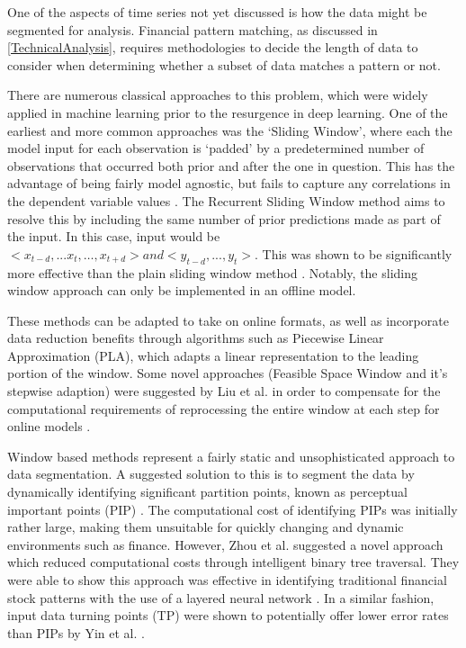 \documentclass[a4paper,latin]{paper}
\begin{document}
One of the aspects of time series not yet discussed is how the data might be segmented for analysis. 
Financial pattern matching, as discussed in \ref{TechnicalAnalysis}, requires methodologies to decide the length of data to 
consider when determining whether a subset of data matches a pattern or not. 
\hfill\break

There are numerous classical approaches to this problem, which were widely applied in machine learning prior to 
the resurgence in deep learning. One of the earliest and more common approaches was the ‘Sliding Window’, 
where each the model input for each observation is ‘padded’ by a predetermined number of observations that 
occurred both prior and after the one in question. This has the advantage of being fairly model agnostic, but fails 
to capture any correlations in the dependent variable values \cite{Chu}. The Recurrent Sliding Window method 
aims to resolve this by including the same number of prior predictions made as part of the input. In this case, input 
would be ${<x_{t-d},...x_{t},…,x_{t+d}> and <y_{t-d},...,y_t>}$. This was shown to be significantly more effective than the plain 
sliding window method \cite{Bakiri}. Notably, the sliding window approach can only be implemented in an offline 
model.
\hfill\break

These methods can be adapted to take on online formats, as well as incorporate data reduction benefits 
through algorithms such as Piecewise Linear Approximation (PLA), which adapts a linear representation to the 
leading portion of the window. Some novel approaches (Feasible Space Window and it’s stepwise adaption) were 
suggested by Liu et al. in order to compensate for the computational requirements of reprocessing the entire 
window at each step for online models \cite{Liu}.
\hfill \break 

Window based methods represent a fairly static and unsophisticated approach to data segmentation. 
A suggested solution to this is to segment the data by dynamically identifying significant partition points, 
known as perceptual important points (PIP) \cite{Chung}. The computational cost of identifying PIPs was initially 
rather large, making them unsuitable for quickly changing and dynamic environments such as finance. 
However, Zhou et al. suggested a novel approach which reduced computational costs through intelligent binary 
tree traversal. They were able to show this approach was effective in identifying traditional financial stock patterns 
with the use of a layered neural network \cite{Zhou}. In a similar fashion, input data turning points (TP) were shown to 
potentially offer lower error rates than PIPs by Yin et al. \cite{Yin}.
\hfill \break 
\end{document}
